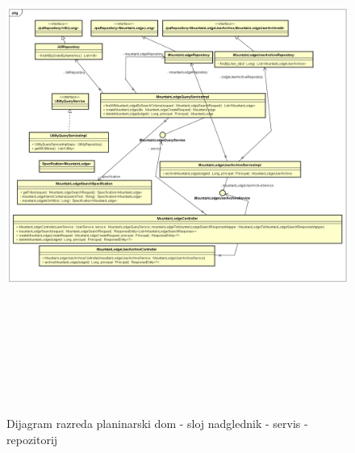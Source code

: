 	\begin{figure}[H]
		\includegraphics[scale=0.6, height=175mm, width=165mm]{dijagrami/csr-lodge-dijagram} %
		\centering
		\caption{Dijagram razreda planinarski dom - sloj nadglednik - servis - repozitorij}
		\label{fig:dijagrami_razreda_dom}
	\end{figure}	
